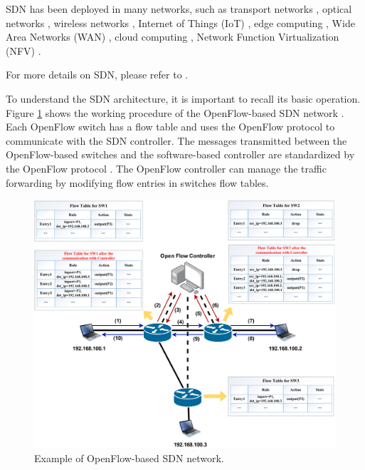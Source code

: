 \begin{itemize}
SDN has been deployed in many networks, such as transport networks \cite{Alvizu2017}, optical networks \cite{Thyagaturu2016}, wireless networks \cite{Haque2016, Chen2015}, Internet of Things (IoT) \cite{Bera2017}, edge computing \cite{Baktir2017}, Wide Area Networks (WAN) \cite{Michel2017}, cloud computing \cite{Jain2013}, Network Function Virtualization (NFV) \cite{Li2015, Liang2015}.
\end{itemize}
For more details on SDN, please refer to \cite{Nunes2014, Jarraya2014, Xia2015, Hu2014, Xie2015, Trois2016, Huang2017, Blenk2016}.

%
To understand the SDN architecture, it is important to recall its basic operation. Figure \ref{fig:{WorkFlow}} shows the working procedure of the OpenFlow-based SDN network \cite{OFP13}. Each OpenFlow switch has a flow table and uses the OpenFlow protocol to communicate with the SDN controller. The messages transmitted between the OpenFlow-based switches and the software-based controller are standardized by the OpenFlow protocol \cite{Erickson2013}. The OpenFlow controller can manage the traffic forwarding by modifying flow entries in switches flow tables.
\begin{figure}[b!]
	\centering
	\includegraphics[scale=0.1]{figure/WorkFlow.jpg}
	\caption{Example of OpenFlow-based SDN network.}
	\label{fig:{WorkFlow}}
\end{figure}
